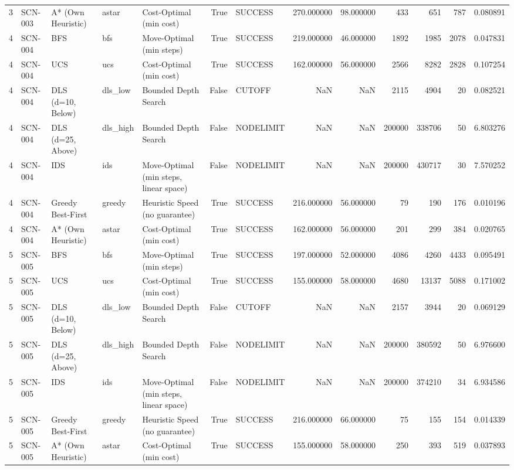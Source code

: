 \begin{table}[htbp]
\begin{tabular}{rllllrlrrrrrr}
3 & SCN-003 & A* (Own Heuristic) & astar & Cost-Optimal (min cost) & True & SUCCESS & 270.000000 & 98.000000 & 433 & 651 & 787 & 0.080891 \\
4 & SCN-004 & BFS & bfs & Move-Optimal (min steps) & True & SUCCESS & 219.000000 & 46.000000 & 1892 & 1985 & 2078 & 0.047831 \\
4 & SCN-004 & UCS & ucs & Cost-Optimal (min cost) & True & SUCCESS & 162.000000 & 56.000000 & 2566 & 8282 & 2828 & 0.107254 \\
4 & SCN-004 & DLS (d=10, Below) & dls\_low & Bounded Depth Search & False & CUTOFF & NaN & NaN & 2115 & 4904 & 20 & 0.082521 \\
4 & SCN-004 & DLS (d=25, Above) & dls\_high & Bounded Depth Search & False & NODELIMIT & NaN & NaN & 200000 & 338706 & 50 & 6.803276 \\
4 & SCN-004 & IDS & ids & Move-Optimal (min steps, linear space) & False & NODELIMIT & NaN & NaN & 200000 & 430717 & 30 & 7.570252 \\
4 & SCN-004 & Greedy Best-First & greedy & Heuristic Speed (no guarantee) & True & SUCCESS & 216.000000 & 56.000000 & 79 & 190 & 176 & 0.010196 \\
4 & SCN-004 & A* (Own Heuristic) & astar & Cost-Optimal (min cost) & True & SUCCESS & 162.000000 & 56.000000 & 201 & 299 & 384 & 0.020765 \\
5 & SCN-005 & BFS & bfs & Move-Optimal (min steps) & True & SUCCESS & 197.000000 & 52.000000 & 4086 & 4260 & 4433 & 0.095491 \\
5 & SCN-005 & UCS & ucs & Cost-Optimal (min cost) & True & SUCCESS & 155.000000 & 58.000000 & 4680 & 13137 & 5088 & 0.171002 \\
5 & SCN-005 & DLS (d=10, Below) & dls\_low & Bounded Depth Search & False & CUTOFF & NaN & NaN & 2157 & 3944 & 20 & 0.069129 \\
5 & SCN-005 & DLS (d=25, Above) & dls\_high & Bounded Depth Search & False & NODELIMIT & NaN & NaN & 200000 & 380592 & 50 & 6.976600 \\
5 & SCN-005 & IDS & ids & Move-Optimal (min steps, linear space) & False & NODELIMIT & NaN & NaN & 200000 & 374210 & 34 & 6.934586 \\
5 & SCN-005 & Greedy Best-First & greedy & Heuristic Speed (no guarantee) & True & SUCCESS & 216.000000 & 66.000000 & 75 & 155 & 154 & 0.014339 \\
5 & SCN-005 & A* (Own Heuristic) & astar & Cost-Optimal (min cost) & True & SUCCESS & 155.000000 & 58.000000 & 250 & 393 & 519 & 0.037893 \\

\end{tabular}
\end{table}
